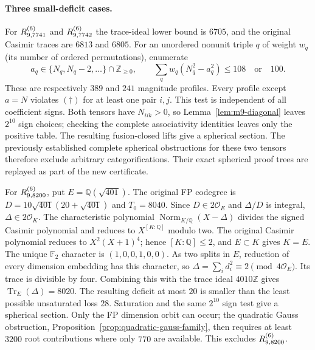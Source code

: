 \paragraph{Three small-deficit cases.}
For $R^{(6)}_{9,7741}$ and $R^{(6)}_{9,7742}$ the trace-ideal lower bound is
$6705$, and the original Casimir traces are $6813$ and $6805$.
For an unordered nonunit triple $q$ of weight $w_q$ (its number of
ordered permutations), enumerate
\[
 a_q\in\{N_q,N_q-2,\ldots\}\cap\mathbb Z_{\geq0},\qquad
 \sum_qw_q(N_q^2-a_q^2)\le108\quad\text{or}\quad100.
\]
These are respectively $389$ and $241$ magnitude profiles. Every profile
except $a=N$ violates $(\dagger)$ for at least one pair $i,j$.
This test is independent of all coefficient signs. Both tensors have
$N_{iik}>0$, so Lemma~\ref{lem:m9-diagonal} leaves $2^{10}$ sign choices;
checking the complete associativity identities leaves only the positive
table. The resulting fusion-closed lifts give a spherical section.
The previously established complete spherical obstructions for these two
tensors therefore exclude arbitrary categorifications. Their exact
spherical proof trees are replayed as part of the new certificate.

For $R^{(6)}_{9,8200}$, put $E=\mathbb Q(\sqrt{401})$. The original
FP codegree is $D=10\sqrt{401}(20+\sqrt{401})$ and $T_0=8040$.
Since $D\in2\mathcal O_E$ and $\Delta/D$ is integral,
$\Delta\in2\mathcal O_K$. The characteristic polynomial
$\operatorname{Norm}_{K/\mathbb Q}(X-\Delta)$ divides the signed
Casimir polynomial and reduces to $X^{[K:\mathbb Q]}$ modulo two.
The original Casimir polynomial reduces to $X^2(X+1)^4$; hence
$[K:\mathbb Q]\le2$, and $E\subset K$ gives $K=E$.
The unique $\mathbb F_2$ character is $(1,0,0,1,0,0)$.
As two splits in $E$, reduction of every dimension embedding has this
character, so $\Delta=\sum_i d_i^2\equiv2\pmod{4\mathcal O_E}$.
Its trace is divisible by four. Combining this with the trace ideal
$4010\mathbb Z$ gives $\operatorname{Tr}_E(\Delta)=8020$.
The resulting deficit at most $20$ is smaller than the least possible
unsaturated loss $28$. Saturation and the same $2^{10}$ sign test give
a spherical section. Only the FP dimension orbit can occur; the quadratic
Gauss obstruction, Proposition~\ref{prop:quadratic-gauss-family}, then
requires at least $3200$ root contributions where only $770$ are available.
This excludes $R^{(6)}_{9,8200}$.

